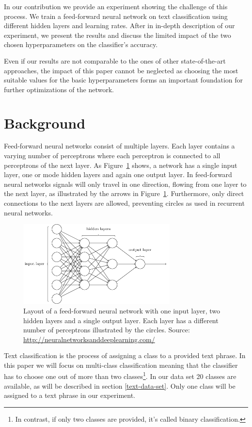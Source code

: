 \documentclass[sigconf]{acmart}
\begin{document}
In our contribution we provide an experiment showing the challenge of this process. We train a feed-forward neural network on text classification using different hidden layers and learning rates. After in in-depth description of our experiment, we present the results and discuss the limited impact of the two chosen hyperparameters on the classifier's accuracy.

Even if our results are not comparable to the ones of other state-of-the-art approaches, the impact of this paper cannot be neglected as choosing the most suitable values for the basic hyperparameters forms an important foundation for further optimizations of the network.

\section{Background}

Feed-forward neural networks consist of multiple layers. Each layer contains a varying number of perceptrons where each perceptron is connected to all perceptrons of the next layer\cite{nielsenneural}. As Figure~\ref{fig:layers} shows, a network has a single input layer, one or mode hidden layers and again one output layer. In feed-forward neural networks signals will only travel in one direction, flowing from one layer to the next layer, as illustrated by the arrows in Figure~\ref{fig:layers}. Furthermore, only direct connections to the next layers are allowed, preventing circles as used in recurrent neural networks. 

\begin{figure}
	\centering
	\includegraphics[width=8cm]{layers.png}
	\caption{Layout of a feed-forward neural network with one input layer, two hidden layers and a single output layer. Each layer has a different number of perceptrons illustrated by the circles. Source: \href{http://neuralnetworksanddeeplearning.com/chap1.html}{http://neuralnetworksanddeeplearning.com/}}
	\label{fig:layers}
\end{figure}

Text classification is the process of assigning a class to a provided text phrase. In this paper we will focus on multi-class classification meaning that the classifier has to choose one out of more than two classes\footnote{In contrast, if only two classes are provided, it's called binary classification.}. In our data set 20 classes are available, as will be described in section \ref{text-data-set}. Only one class will be assigned to a text phrase in our experiment.
\end{document}
